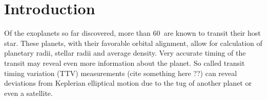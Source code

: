 \documentclass[manuscript]{aastex}
\newcommand{\numt}{60}
\begin{document}


\begin{abstract}
\end{abstract}






\section{Introduction}
Of the exoplanets so far discovered, more than \numt\ are known to transit their
host star. These planets, with their favorable orbital alignment,
allow for calculation of planetary radii, stellar radii and average
density. Very accurate timing of the transit may reveal even more
information about the planet. So called transit timing variation (TTV)
measurements (cite something here ??) can reveal deviations from
Keplerian elliptical motion due to the tug of another planet or even a
satellite.
\end{document}
